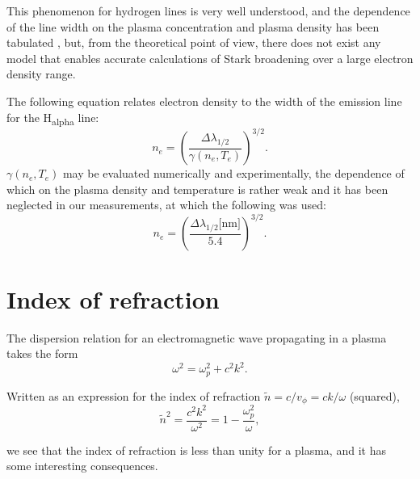\documentclass[justified,nofonts,nobib]{tufte-book}
\begin{document}
This phenomenon for hydrogen lines is very well understood, and the dependence of the line width on the plasma concentration and plasma density has been tabulated \cite{Griem1964PlasmaSpectroscopy,Griem1974SpectralPlasmas.}, but, from the theoretical point of view, there does not exist any model that enables accurate calculations of Stark broadening over a large electron density range\cite{Griem2000StarkPlasmas}. 

The following equation relates electron density to the width of the emission line for the H\textsubscript{alpha} line:
\begin{equation}
n_e=\left( \frac{\Delta\lambda_{1/2}}{\gamma\left(n_e,T_e\right)}\right)^{3/2}.
\end{equation}
$\gamma\left(n_e,T_e\right)$ may be evaluated numerically and experimentally\cite{Griem2005ComparisonResults}, the dependence of which on the plasma density and temperature is rather weak and it has been neglected in our measurements, at which the following was used:
\begin{equation}
n_e=\left( \frac{\Delta\lambda_{1/2}\text{[nm]}}{5.4}\right)^{3/2}. \label{eq:delta_lambda}
\end{equation}
\section{Index of refraction}\label{sec:indexrefraction}

The dispersion relation \cite{Chen1984IntroductionFusion} for an electromagnetic wave propagating in a plasma takes the form
\begin{equation}
\omega^2=\omega_p^2+c^2 k^2.
\end{equation}

Written as an expression for the index of refraction $\tilde{n}=c/v_\phi = ck/\omega$ (squared),
\begin{equation}
\tilde{n}^2=\frac{c^2 k^2}{\omega^2}=1-\frac{\omega_p^2}{\omega}, \label{eq:index_of_refraction}
\end{equation}

we see that the index of refraction is less than unity for a plasma, and it has some interesting consequences.
\end{document}

